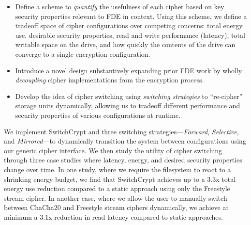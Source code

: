 \begin{itemize}
  \item Define a scheme to \emph{quantify} the usefulness of each cipher based
  on key security properties relevant to FDE in context. Using this scheme, we
  define a tradeoff space of cipher configurations over competing concerns:
  total energy use, desirable security properties, read and write performance
  (latency), total writable space on the drive, and how quickly the contents of
  the drive can converge to a single encryption configuration.

  \item Introduce a novel design substantively expanding prior FDE work by
  wholly \emph{decoupling} cipher implementations from the encryption process.

  \item Develop the idea of cipher switching using \emph{switching strategies}
  to ``re-cipher'' storage units dynamically, allowing us to tradeoff different
  performance and security properties of various configurations at runtime.
\end{itemize}

We implement SwitchCrypt and three switching strategies---\emph{Forward},
\emph{Selective}, and \emph{Mirrored}---to dynamically transition the system
between configurations using our generic cipher interface. We then study the
utility of cipher switching through three case studies where latency, energy,
and desired security properties change over time. In one study, where we require
the filesystem to react to a shrinking energy budget, we find that SwitchCrypt
achieves up to a 3.3x total energy use reduction compared to a static approach
using only the Freestyle stream cipher. In another case, where we allow the user
to manually switch between ChaCha20 and Freestyle stream ciphers dynamically, we
achieve at minimum a 3.1x reduction in read latency compared to static
approaches.



\pagebreak




